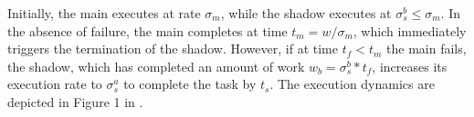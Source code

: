 
Initially, the main executes at rate $\sigma_m$, while the shadow executes at $\sigma_s^b \le \sigma_m$. %
In the absence of failure, the main completes at time 
$t_m = w/\sigma_m$, which immediately triggers the termination of the
shadow. However, if at time $t_f < t_m$ the main fails, the shadow, which has completed an amount of work $w_b=\sigma_s^b * t_f$, increases its execution rate to $\sigma_s^a$ to complete the task by $t_s$. %
The execution dynamics are depicted in Figure 1 in \cite{cui_en7085151}. %



